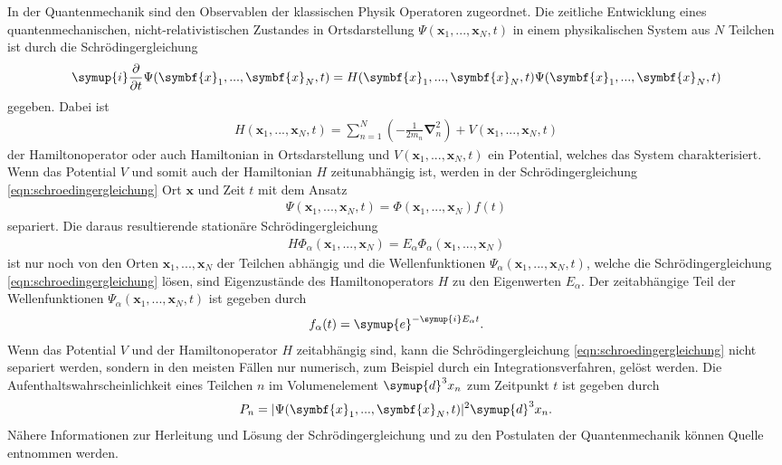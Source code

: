 In der Quantenmechanik sind den Observablen der klassischen Physik Operatoren zugeordnet.
Die zeitliche Entwicklung eines quantenmechanischen, nicht-relativistischen Zustandes in Ortsdarstellung $\Psi(\symbf{x}_1,...,\symbf{x}_N,t)$ in einem physikalischen System aus $N$ Teilchen ist durch die Schrödingergleichung
\begin{align}
  \symup{i} \frac{\partial}{\partial t} \Psi(\symbf{x}_1,...,\symbf{x}_N,t) = H(\symbf{x}_1,...,\symbf{x}_N,t) \Psi(\symbf{x}_1,...,\symbf{x}_N,t)
  \label{eqn:schroedingergleichung}
\end{align}
gegeben. Dabei ist
\begin{align}
  H(\symbf{x}_1,...,\symbf{x}_N,t) = \sum_{n=1}^{N} \left( -\frac1{2 m_n} \symbf{\nabla}_n^2 \right) + V(\symbf{x}_1,...,\symbf{x}_N,t)
  \label{eqn:hamiltonian}
\end{align}
der Hamiltonoperator oder auch Hamiltonian in Ortsdarstellung und $V(\symbf{x}_1,...,\symbf{x}_N,t)$ ein Potential, welches das System charakterisiert.
Wenn das Potential $V$ und somit auch der Hamiltonian $H$ zeitunabhängig ist, werden in der Schrödingergleichung \eqref{eqn:schroedingergleichung} Ort $\symbf{x}$ und Zeit $t$ mit dem Ansatz
\begin{align}
  \Psi(\symbf{x}_1,...,\symbf{x}_N,t) = \Phi(\symbf{x}_1,...,\symbf{x}_N)f(t)
  \label{eqn:separation}
\end{align}
separiert. Die daraus resultierende stationäre Schrödingergleichung
\begin{align}
  H \Phi_\alpha(\symbf{x}_1,...,\symbf{x}_N) = E_\alpha \Phi_\alpha(\symbf{x}_1,...,\symbf{x}_N)
  \label{eqn:statschroedinger}
\end{align}
ist nur noch von den Orten $\symbf{x}_1,...,\symbf{x}_N$ der Teilchen abhängig und die Wellenfunktionen $\Psi_\alpha(\symbf{x}_1,...,\symbf{x}_N,t)$, welche die Schrödingergleichung \eqref{eqn:schroedingergleichung} lösen, sind Eigenzustände des Hamiltonoperators $H$ zu den Eigenwerten $E_\alpha$.
Der zeitabhängige Teil der Wellenfunktionen $\Psi_\alpha(\symbf{x}_1,...,\symbf{x}_N,t)$ ist gegeben durch
\begin{align}
  f_\alpha(t) = \symup{e}^{-\symup{i} E_\alpha t}.
\end{align}
Wenn das Potential $V$ und der Hamiltonoperator $H$ zeitabhängig sind, kann die Schrödingergleichung \eqref{eqn:schroedingergleichung} nicht separiert werden, sondern in den meisten Fällen nur numerisch, zum Beispiel durch ein Integrationsverfahren, gelöst werden.
Die Aufenthaltswahrscheinlichkeit eines Teilchen $n$ im Volumenelement $\symup{d}^3x_n$ zum Zeitpunkt $t$ ist gegeben durch
\begin{align}
  P_n = \lvert \Psi(\symbf{x}_1,...,\symbf{x}_N,t) \rvert^2 \symup{d}^3x_n.
\end{align}
Nähere Informationen zur Herleitung und Lösung der Schrödingergleichung und zu den Postulaten der Quantenmechanik können Quelle \cite{schwabl} entnommen werden.

